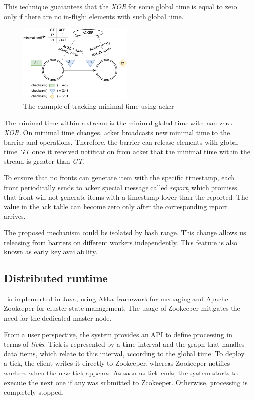 This technique guarantees that the {\it XOR} for some global time is equal to zero only if there are no in-flight elements with such global time.

\begin{figure}[ht]
  \centering
  \includegraphics[width=0.5\textwidth]{pics/acker}
  \caption{The example of tracking minimal time using acker}
  \label {acker}
\end{figure}

The minimal time within a stream is the minimal global time with non-zero {\it XOR}. On minimal time changes, acker broadcasts new minimal time to the barrier and operations. Therefore, the barrier can release elements with global time {\it GT} once it received notification from acker that the minimal time within the stream is greater than {\it GT}.

To ensure that no fronts can generate item with the specific timestamp, each front periodically sends to acker special message called {\it report}, which promises that front will not generate items with a timestamp lower than the reported. The value in the ack table can become zero only after the corresponding report arrives.

The proposed mechanism could be isolated by hash range. This change allows us releasing from barriers on different workers independently. This feature is also known as early key availability.

\subsection{Distributed runtime}

\FlameStream\ is implemented in Java, using Akka framework for messaging and Apache Zookeeper for cluster state management. The usage of Zookeeper mitigates the need for the dedicated master node.

From a user perspective, the system provides an API to define processing in terms of {\it ticks}. Tick is represented by a time interval and the graph that handles data items, which relate to this interval, according to the global time. To deploy a tick, the client writes it directly to Zookeeper, whereas Zookeeper notifies workers when the new tick appears. As soon as tick ends, the system starts to execute the next one if any was submitted to Zookeeper. Otherwise, processing is completely stopped.


